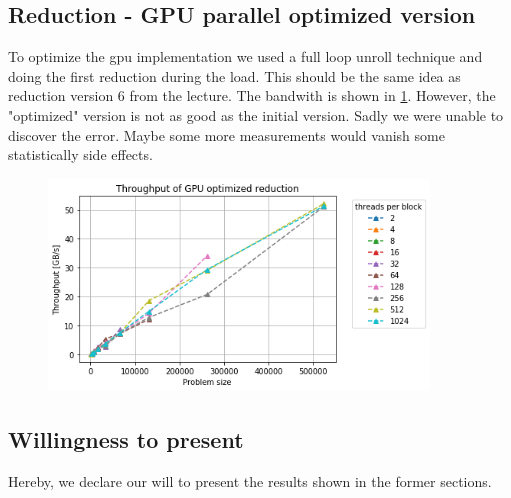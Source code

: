 \documentclass[12pt]{article}
\begin{document}
\subsection{Reduction - GPU parallel optimized version}
To optimize the gpu implementation we used a full loop unroll technique and doing the first reduction during the load. This should be the same idea as reduction version 6 from the lecture. The bandwith is shown in \ref{fig:gpu_opt}. However, the "optimized" version is not as good as the initial version. Sadly we were unable to discover the error. Maybe some more measurements would vanish some statistically side effects.


\begin{figure}
	\centering
	\includegraphics[width=0.9\textwidth]{gpu_optimized.png}
	\label{fig:gpu_opt}
\end{figure}

\subsection{Willingness to present}
Hereby, we declare our will to present the results shown in the former sections.
\end{document}
